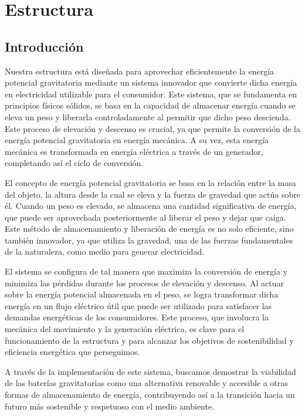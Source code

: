 \chapter{Estructura}

    \section{Introducción}
    
        Nuestra estructura está diseñada para aprovechar eficientemente la energía potencial gravitatoria mediante un sistema innovador que convierte dicha energía en electricidad utilizable para el consumidor. Este sistema, que se fundamenta en principios físicos sólidos, se basa en la capacidad de almacenar energía cuando se eleva un peso y liberarla controladamente al permitir que dicho peso descienda. Este proceso de elevación y descenso es crucial, ya que permite la conversión de la energía potencial gravitatoria en energía mecánica. A su vez, esta energía mecánica es transformada en energía eléctrica a través de un generador, completando así el ciclo de conversión.\par
        El concepto de energía potencial gravitatoria se basa en la relación entre la masa del objeto, la altura desde la cual se eleva y la fuerza de gravedad que actúa sobre él. Cuando un peso es elevado, se almacena una cantidad significativa de energía, que puede ser aprovechada posteriormente al liberar el peso y dejar que caiga. Este método de almacenamiento y liberación de energía es no solo eficiente, sino también innovador, ya que utiliza la gravedad, una de las fuerzas fundamentales de la naturaleza, como medio para generar electricidad.\par
        El sistema se configura de tal manera que maximiza la conversión de energía y minimiza las pérdidas durante los procesos de elevación y descenso. Al actuar sobre la energía potencial almacenada en el peso, se logra transformar dicha energía en un flujo eléctrico útil que puede ser utilizado para satisfacer las demandas energéticas de los consumidores. Este proceso, que involucra la mecánica del movimiento y la generación eléctrica, es clave para el funcionamiento de la estructura y para alcanzar los objetivos de sostenibilidad y eficiencia energética que perseguimos.\par
        A través de la implementación de este sistema, buscamos demostrar la viabilidad de las baterías gravitatorias como una alternativa renovable y accesible a otras formas de almacenamiento de energía, contribuyendo así a la transición hacia un futuro más sostenible y respetuoso con el medio ambiente.\par
        

